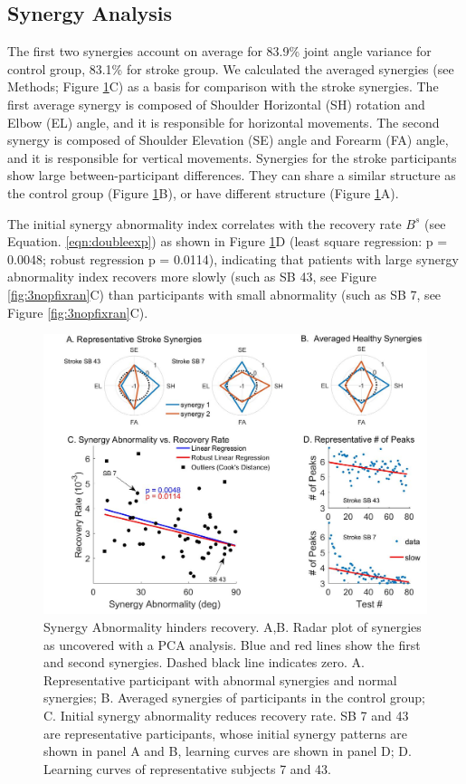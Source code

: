 \subsection{Synergy Analysis}

The first two synergies account on average for 83.9\% joint angle variance for control group, 83.1\% for stroke group. 
We calculated the averaged synergies (see Methods; Figure \ref{fig:6synergy}C) as a basis for comparison with the stroke synergies. 
The first average synergy is composed of Shoulder Horizontal (SH) rotation and Elbow (EL) angle, and it is responsible for horizontal movements. 
The second synergy is composed of Shoulder Elevation (SE) angle and Forearm (FA) angle, and it is responsible for vertical movements. 
Synergies for the stroke participants show large between-participant differences. 
They can share a similar structure as the control group (Figure \ref{fig:6synergy}B), or have different structure (Figure \ref{fig:6synergy}A).

The initial synergy abnormality index correlates with the recovery rate $ B^s $ (see Equation. \ref{eqn:doubleexp}) as shown in Figure \ref{fig:6synergy}D (least square regression: p = 0.0048; robust regression p = 0.0114), indicating that patients with large synergy abnormality index recovers more slowly (such as SB 43, see Figure \ref{fig:3nopfixran}C) than participants with small abnormality (such as SB 7, see Figure \ref{fig:3nopfixran}C).

\begin{figure}
	\centering
	\includegraphics[width=1\linewidth]{figures/6synergy}
	\caption[Synergy Analysis]
	{Synergy Abnormality hinders recovery. 
		A,B. Radar plot of synergies as uncovered with a PCA analysis. Blue and red lines show the first and second synergies. Dashed black line indicates zero.
		A. Representative participant with abnormal synergies and normal synergies;
		B. Averaged synergies of participants in the control group;
		C. Initial synergy abnormality reduces recovery rate. SB 7 and 43 are representative participants, whose initial synergy patterns are shown in panel A and B, learning curves are shown in panel D; 
		D. Learning curves of representative subjects 7 and 43.}
	\label{fig:6synergy}
\end{figure}

